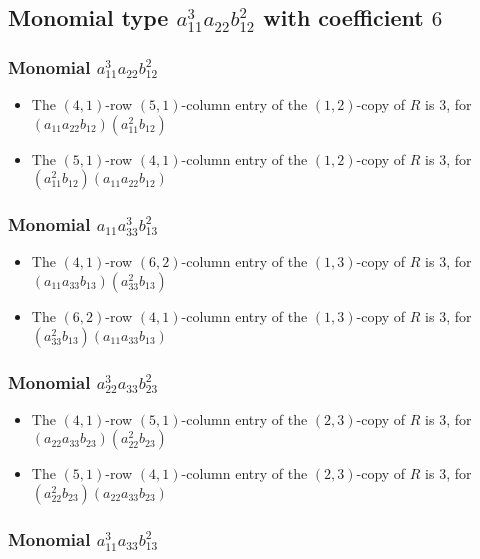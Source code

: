\documentclass{article}
\begin{document}
\subsection{Monomial type $ a_{11}^{3} a_{22} b_{12}^{2} $ with coefficient $ 6 $}

\subsubsection{Monomial $ a_{11}^{3} a_{22} b_{12}^{2} $}

\begin{itemize}
\item The $(4, 1)$-row $(5, 1)$-column entry of the $ \left(1, 2\right) $-copy of $R$ is $ 3 $, for $( a_{11} a_{22} b_{12} )( a_{11}^{2} b_{12} )$ 
\item The $(5, 1)$-row $(4, 1)$-column entry of the $ \left(1, 2\right) $-copy of $R$ is $ 3 $, for $( a_{11}^{2} b_{12} )( a_{11} a_{22} b_{12} )$ 
\end{itemize}
\subsubsection{Monomial $ a_{11} a_{33}^{3} b_{13}^{2} $}

\begin{itemize}
\item The $(4, 1)$-row $(6, 2)$-column entry of the $ \left(1, 3\right) $-copy of $R$ is $ 3 $, for $( a_{11} a_{33} b_{13} )( a_{33}^{2} b_{13} )$ 
\item The $(6, 2)$-row $(4, 1)$-column entry of the $ \left(1, 3\right) $-copy of $R$ is $ 3 $, for $( a_{33}^{2} b_{13} )( a_{11} a_{33} b_{13} )$ 
\end{itemize}
\subsubsection{Monomial $ a_{22}^{3} a_{33} b_{23}^{2} $}

\begin{itemize}
\item The $(4, 1)$-row $(5, 1)$-column entry of the $ \left(2, 3\right) $-copy of $R$ is $ 3 $, for $( a_{22} a_{33} b_{23} )( a_{22}^{2} b_{23} )$ 
\item The $(5, 1)$-row $(4, 1)$-column entry of the $ \left(2, 3\right) $-copy of $R$ is $ 3 $, for $( a_{22}^{2} b_{23} )( a_{22} a_{33} b_{23} )$ 
\end{itemize}
\subsubsection{Monomial $ a_{11}^{3} a_{33} b_{13}^{2} $}
\end{document}
